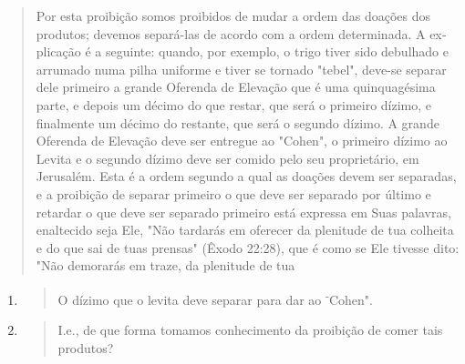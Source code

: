 \begin{quote}
Por esta proibição somos proibidos de mudar a ordem das doações dos
produtos; devemos separá-las de acordo com a ordem determinada. A
ex­plicação é a seguinte: quando, por exemplo, o trigo tiver sido
debulhado e ar­rumado numa pilha uniforme e tiver se tornado "tebel",
deve-se separar dele primeiro a grande Oferenda de Elevação que é uma
quinquagésima parte, e de­pois um décimo do que restar, que será o
primeiro dízimo, e finalmente um décimo do restante, que será o segundo
dízimo. A grande Oferenda de Eleva­ção deve ser entregue ao "Cohen", o
primeiro dízimo ao Levita e o segundo dízimo deve ser comido pelo seu
proprietário, em Jerusalém. Esta é a ordem segundo a qual as doações
devem ser separadas, e a proibição de separar pri­meiro o que deve ser
separado por último e retardar o que deve ser separado primeiro está
expressa em Suas palavras, enaltecido seja Ele, "Não tardarás em
oferecer da plenitude de tua colheita e do que sai de tuas prensas"
(Êxodo 22:28), que é como se Ele tivesse dito: "Não demorarás em traze,
da plenitude de tua
\end{quote}

\begin{enumerate}
\def\labelenumi{\arabic{enumi}.}
\setcounter{enumi}{317}
\item
  \begin{quote}
  O dízimo que o levita deve separar para dar ao
  \textsuperscript{-}Cohen".
  \end{quote}
\item
  \begin{quote}
  I.e., de que forma tomamos conhecimento da proibição de comer tais
  produtos?
  \end{quote}
\end{enumerate}

